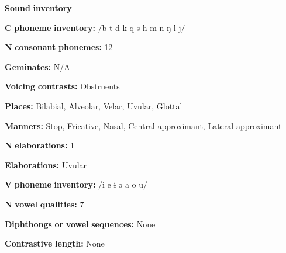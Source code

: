 \begin{styleBody}
\textbf{Sound} \textbf{inventory}
\end{styleBody}

\begin{styleBody}
\textbf{C} \textbf{phoneme} \textbf{inventory:} /b t d k q s h m n ŋ l j/
\end{styleBody}

\begin{styleBody}
\textbf{N} \textbf{consonant} \textbf{phonemes:} 12
\end{styleBody}

\begin{styleBody}
\textbf{Geminates:} N/A
\end{styleBody}

\begin{styleBody}
\textbf{Voicing} \textbf{contrasts:} Obstruents
\end{styleBody}

\begin{styleBody}
\textbf{Places:} Bilabial, Alveolar, Velar, Uvular, Glottal
\end{styleBody}

\begin{styleBody}
\textbf{Manners:} Stop, Fricative, Nasal, Central approximant, Lateral approximant
\end{styleBody}

\begin{styleBody}
\textbf{N} \textbf{elaborations:} 1
\end{styleBody}

\begin{styleBody}
\textbf{Elaborations:} Uvular
\end{styleBody}

\begin{styleBody}
\textbf{V} \textbf{phoneme} \textbf{inventory:} /i e ɨ ə a o u/
\end{styleBody}

\begin{styleBody}
\textbf{N} \textbf{vowel} \textbf{qualities:} 7
\end{styleBody}

\begin{styleBody}
\textbf{Diphthongs} \textbf{or} \textbf{vowel} \textbf{sequences:} None
\end{styleBody}

\begin{styleBody}
\textbf{Contrastive} \textbf{length:} None
\end{styleBody}

